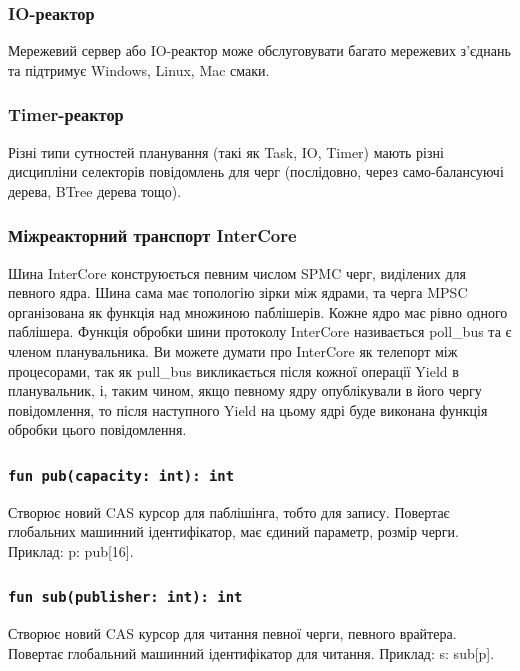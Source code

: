 \documentclass{article}
\begin{document}
\subsubsection*{IO-реактор}
Мережевий сервер або IO-реактор може обслуговувати багато
мережевих з'єднань та підтримує Windows, Linux, Mac смаки.

\subsubsection*{Timer-реактор}
Різні типи сутностей планування (такі як Task, IO, Timer)
мають різні дисципліни селекторів повідомлень для черг
(послідовно, через само-балансуючі дерева, BTree дерева тощо).

\subsubsection{Міжреакторний транспорт InterCore}
Шина InterCore конструюється певним числом SPMC черг, виділених для певного ядра.
Шина сама має топологію зірки між ядрами, та черга MPSC організована
як функція над множиною паблішерів. Кожне ядро має рівно одного паблішера.
Функція обробки шини протоколу InterCore називається poll\_bus та є членом планувальника.
Ви можете думати про InterCore як телепорт між процесорами, так як pull\_bus
викликається після кожної операції Yield в планувальник, і, таким чином,
якщо певному ядру опублікували в його чергу повідомлення, то після наступного Yield
на цьому ядрі буде виконана функція обробки цього повідомлення.

\subsubsection*{\lstinline{fun pub(capacity: int): int}}
Створює новий CAS курсор для паблішінга, тобто для запису.
Повертає глобальних машинний ідентифікатор, має єдиний параметр, розмір черги.
Приклад: p: pub[16].

\subsubsection*{\lstinline{fun sub(publisher: int): int}}
Створює новий CAS курсор для читання певної черги, певного врайтера.
Повертає глобальний машинний ідентифікатор для читання.
Приклад: s: sub[p].
\end{document}
